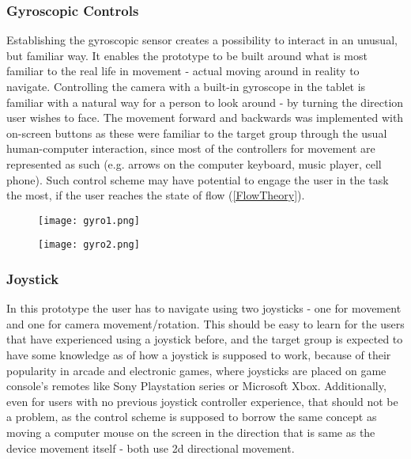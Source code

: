 \subsubsection{Gyroscopic Controls}
Establishing the gyroscopic sensor creates a possibility to interact in an unusual, but familiar way. It enables the prototype to be built around what is most familiar to the real life in movement - actual moving around in reality to navigate.
Controlling the camera with a built-in gyroscope in the tablet is familiar with a natural way for a person to look around - by turning the direction user wishes to face. The movement forward and backwards was implemented with on-screen buttons as these were familiar to the target group through the usual human-computer interaction, since most of the controllers for movement are represented as such (e.g. arrows on the computer keyboard, music player, cell phone).
Such control scheme may have potential to engage the user in the task the most, if the user reaches the state of flow (\ref{FlowTheory}).

\begin{figure}[H]
\centering
\begin{minipage}{.5\textwidth}
  \centering
  \texttt{[image: gyro1.png]}
  \label{fig:test1}
\end{minipage}%
\begin{minipage}{.5\textwidth}
  \centering
  \texttt{[image: gyro2.png]}
  \label{fig:test2}
\end{minipage}
\end{figure}


\subsubsection{Joystick}
In this prototype the user has to navigate using two joysticks - one for movement and one for camera movement/rotation. This should be easy to learn for the users that have experienced using a joystick before, and the target group is expected to have some knowledge as of how a joystick is supposed to work, because of their popularity in arcade and electronic games, where joysticks are placed on game console’s remotes like Sony Playstation series or Microsoft Xbox. Additionally, even for users with no previous joystick controller experience, that should not be a problem, as the control scheme is supposed to borrow the same concept as moving a computer mouse on the screen in the direction that is same as the device movement itself - both use 2d directional movement.

